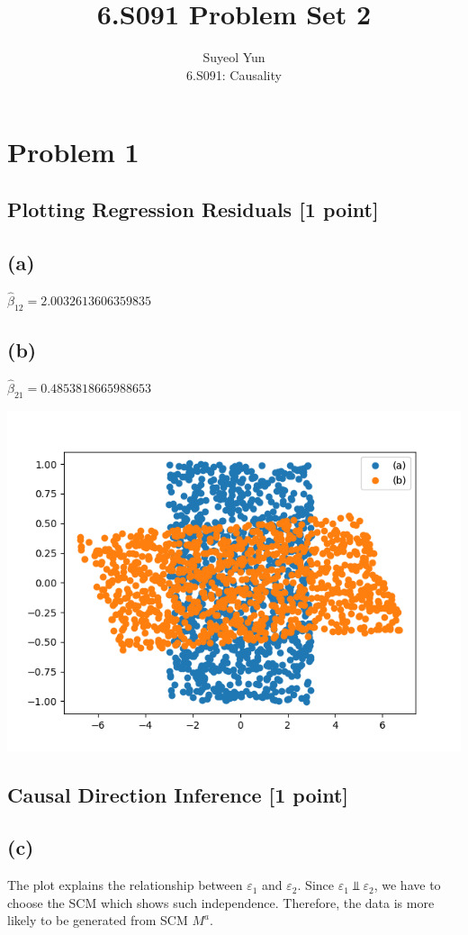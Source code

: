 \documentclass[10pt]{article}
\begin{document}
 
\title{6.S091 Problem Set 2}
\author{Suyeol Yun\\
6.S091: Causality}
\maketitle
 
\section{Problem 1}
\subsection{Plotting Regression Residuals [1 point]}
\subsection{(a)} $\hat{\beta}_{12} = 2.0032613606359835$
\subsection{(b)} $\hat{\beta}_{21} = 0.4853818665988653$

\includegraphics{images/problem1.png}

\subsection{Causal Direction Inference [1 point]}

\subsection{(c)}
The plot explains the relationship between $\varepsilon_1$ and $\varepsilon_2$. Since $\varepsilon_1 \Perp \varepsilon_2$, we have to choose the SCM which shows such independence. Therefore, the data is more likely to be generated from SCM $M^a$.
\end{document}
